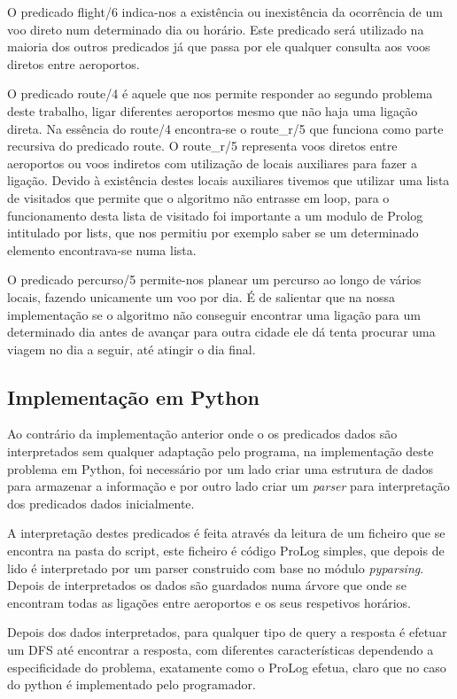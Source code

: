 \documentclass[12pt,a4paper]{report}
\begin{document}
O predicado flight/6 indica-nos a existência ou inexistência da ocorrência de um voo direto num determinado dia ou horário. Este predicado será utilizado na maioria dos outros predicados já que passa por ele qualquer consulta aos voos diretos entre aeroportos.

O predicado route/4 é aquele que nos permite responder ao segundo problema deste trabalho, ligar diferentes aeroportos mesmo que não haja uma ligação direta. Na essência do route/4 encontra-se o route\_r/5 que funciona como parte recursiva do predicado route. O route\_r/5 representa voos diretos entre aeroportos ou voos indiretos com utilização de locais auxiliares para fazer a ligação. Devido à existência destes locais auxiliares tivemos que utilizar uma lista de visitados que permite que o algoritmo não entrasse em loop, para o funcionamento desta lista de visitado foi importante a um modulo de Prolog intitulado por lists, que nos permitiu por exemplo saber se um determinado elemento encontrava-se numa lista.

O predicado percurso/5 permite-nos planear um percurso ao longo de vários locais, fazendo unicamente um voo por dia. É de salientar que na nossa implementação se o algoritmo não conseguir encontrar uma ligação para um determinado dia antes de avançar para outra cidade ele dá tenta procurar uma viagem no dia a seguir, até atingir o dia final.
\subsection{Implementação em Python}
Ao contrário da implementação anterior onde o os predicados dados são interpretados sem qualquer adaptação pelo programa, na implementação deste problema em Python, foi necessário por um lado criar uma estrutura de dados para armazenar a informação e por outro lado criar um \textit{parser} para interpretação dos predicados dados inicialmente.

A interpretação destes predicados é feita através da leitura de um ficheiro que se encontra na pasta do script, este ficheiro é código ProLog simples, que depois de lido é interpretado por um parser construido com base no módulo \textit{pyparsing}. Depois de interpretados os dados são guardados numa árvore que onde se encontram todas as ligações entre aeroportos e os seus respetivos horários.

Depois dos dados interpretados, para qualquer tipo de query a resposta é efetuar um DFS até encontrar a resposta, com diferentes características dependendo a especificidade do problema, exatamente como o ProLog efetua, claro que no caso do python é implementado pelo programador.
\end{document}
